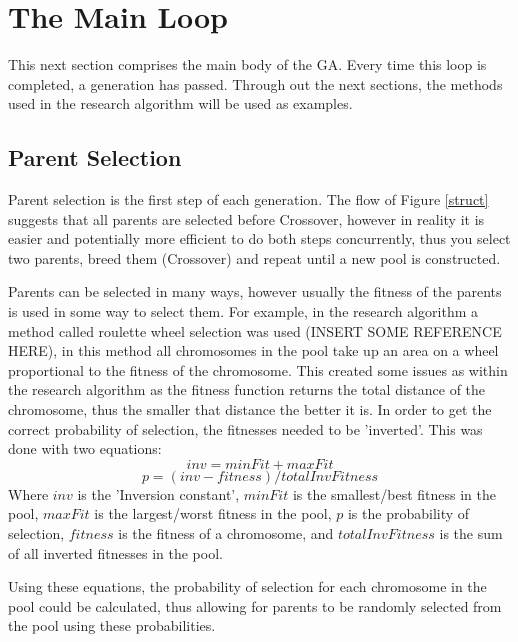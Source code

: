 \section{The Main Loop}
\par
This next section comprises the main body of the GA. Every time this loop is completed, a generation has passed. Through out the next sections, the methods used in the research algorithm will be used as examples.
\subsection{Parent Selection}\label{parents}
\par
Parent selection is the first step of each generation. The flow of Figure \ref{struct} suggests that all parents are selected before Crossover, however in reality it is easier and potentially more efficient to do both steps concurrently, thus you select two parents, breed them (Crossover) and repeat until a new pool is constructed.
\par
Parents can be selected in many ways, however usually the fitness of the parents is used in some way to select them. For example, in the research algorithm a method called roulette wheel selection was used (INSERT SOME REFERENCE HERE), in this method all chromosomes in the pool take up an area on a wheel proportional to the fitness of the chromosome. This created some issues as within the research algorithm as the fitness function returns the total distance of the chromosome, thus the smaller that distance the better it is. In order to get the correct probability of selection, the fitnesses needed to be 'inverted'. This was done with two equations: 
\[ inv = minFit + maxFit\]
\[ p = (inv - fitness)/totalInvFitness\]
Where $inv$ is the 'Inversion constant', $minFit$ is the smallest/best fitness in the pool, $maxFit$ is the largest/worst fitness in the pool, $p$ is the probability of selection, $fitness$ is the fitness of a chromosome, and $totalInvFitness$ is the sum of all inverted fitnesses in the pool.
\par
Using these equations, the probability of selection for each chromosome in the pool could be calculated, thus allowing for parents to be randomly selected from the pool using these probabilities.
